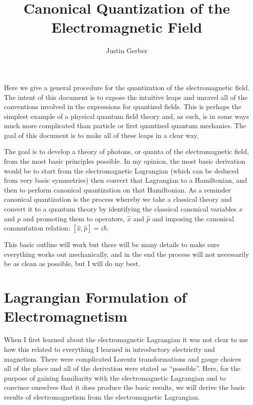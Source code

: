 \documentclass[12pt]{article}
\begin{document}
 
\title{Canonical Quantization of the Electromagnetic Field}%
\author{Justin Gerber}

\maketitle

Here we give a general procedure for the quantization of the electromagnetic field.
The intent of this document is to expose the intuitive leaps and unravel all of the conventions involved in the expressions for quantized fields.
This is perhaps the simplest example of a physical quantum field theory and, as such, is in some ways much more complicated than particle or first quantized quantum mechanics.
The goal of this document is to make all of these leaps in a clear way.

The goal is to develop a theory of photons, or quanta of the electromagnetic field, from the most basic principles possible.
In my opinion, the most basic derivation would be to start from the electromagnetic Lagrangian (which can be deduced from very basic symmetries) then convert that Lagrangian to a Hamiltonian, and then to perform canonical quantization on that Hamiltonian.
As a reminder canonical quantization is the process whereby we take a classical theory and convert it to a quantum theory by identifying the classical canonical variables $x$ and $p$ and promoting them to operators, $\hat{x}$ and $\hat{p}$ and imposing the canonical commutation relation: $[\hat{x},\hat{p}]=i\hbar$.

This basic outline will work but there will be many details to make sure everything works out mechanically, and in the end the process will not necessarily be as clean as possible, but I will do my best.
\section{Lagrangian Formulation of Electromagnetism}
When I first learned about the electromagnetic Lagrangian it was not clear to me how this related to everything I learned in introductory electricity and magnetism.
There were complicated Lorentz transformations and gauge choices all of the place and all of the derivation were stated as ``possible''.
Here, for the purpose of gaining familiarity with the electromagnetic Lagrangian and to convince ourselves that it does produce the basic results, we will derive the basic results of electromagnetism  from the electromagnetic Lagrangian.
\end{document}
